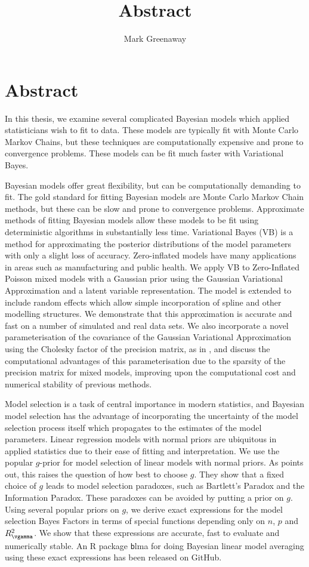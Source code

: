 \documentclass{article}
\title{Abstract}
\author{Mark Greenaway}
\begin{document}
\maketitle

\section{Abstract}
In this thesis, we examine several complicated Bayesian models which applied statisticians wish to fit
to data. These models are typically fit with Monte Carlo Markov Chains, but these techniques are
computationally expensive and prone to convergence problems. These models can be fit much faster with Variational 
Bayes.

Bayesian models offer great flexibility, but can be computationally demanding to fit. The gold standard for
fitting Bayesian models are Monte Carlo Markov Chain methods, but these can be slow and prone to convergence
problems. Approximate methods of fitting Bayesian models allow these models to be fit using deterministic
algorithms in substantially less time. Variational Bayes (VB) is a method for approximating the posterior
distributions of the model parameters with only a slight loss of accuracy.
Zero-inflated models have many
applications in areas such as manufacturing and public health.
We apply VB to Zero-Inflated Poisson mixed
models with a Gaussian prior using the Gaussian Variational Approximation and a latent variable representation.
The model is extended to include random effects which allow simple
incorporation of spline and other modelling structures. 
We demonstrate that this
approximation is accurate and fast on a number of simulated and real data sets. We also incorporate a novel
parameterisation of the covariance of the Gaussian Variational Approximation using the Cholesky factor of the
precision matrix, as in \cite{Tan2016}, and discuss the computational advantages of this parameterisation due
to the sparsity of the precision matrix for mixed models, improving upon the computational cost and numerical stability of previous methods.

Model selection is a task of central importance in modern statistics, and  Bayesian model selection has the
advantage of incorporating the uncertainty of the model selection process itself which propagates to the
estimates of the model  parameters. Linear regression models with normal priors are ubiquitous in applied
statistics due to their ease of fitting and interpretation. We use the popular $g$-prior \cite{Zellner1986}
for model selection of linear models with normal priors. As \cite{Liang2008} points out, this raises the
question of how best to choose $g$. They show that a fixed choice of $g$ leads to model selection paradoxes,
such as Bartlett's Paradox and the Information Paradox. These paradoxes can be avoided by putting a prior on
$g$. Using several popular priors on $g$, we derive exact expressions for the model selection Bayes Factors in
terms of special functions depending only on $n$, $p$ and $R_\vgamma^2$. We show that these expressions are
accurate, fast to evaluate and numerically stable. An R package {\texttt blma} for doing Bayesian linear model
averaging using these exact expressions has been  released on GitHub.
\end{document}
